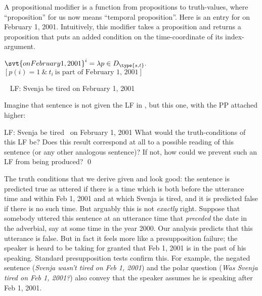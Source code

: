 A propositional modifier is a function from propositions to truth-values, where
``proposition'' for us now means ``temporal proposition''. Here is an entry for
on February 1, 2001. %
%
Intuitively, this modifier takes a proposition and returns a proposition that
puts an added condition on the time-coordinate of its index-argument.

\ex
$\svt{on February 1, 2001}^{i} = \lambda p \in D_{\type{s,t}}.$\\
\hfill$[p(i) = 1\ \&\ t_{i}\ \text{is part of February 1, 2001}]$\label{ex:pp}
\xe

\ex~ LF: \past \lb[VP] \lb[VP] Svenja be tired \rb \lb[PP] on February 1, 2001 \rb
\rb\label{ex:on-lf} \xe

\begin{exercise}
  Imagine that sentence  is not given the LF in \Last, but this one,
  with the PP attached higher:

  \ex LF: \lb[T$'$] \past \lb[VP] Svenja be tired \rb \rb\, \lb[PP] on
  February 1, 2001\rb \xe
%
  What would the truth-conditions of this LF be? Does this result correspond at
  all to a possible reading of this sentence (or any other analogous sentence)?
  If not, how could we prevent such an LF from being produced? \qed

\end{exercise}

The truth conditions that we derive given  and  look
good: the sentence is predicted true as uttered if there is a time which is both
before the utterance time and within Feb 1, 2001 and at which Svenja is tired, and
it is predicted false if there is no such time. But arguably this is not
\emph{exactly} right. Suppose that somebody uttered this sentence at an
utterance time that \emph{preceded} the date in the adverbial, say at some time
in the year 2000. Our analysis predicts that this utterance is false. But in
fact it feels more like a presupposition failure; the speaker is heard to be
taking for granted that Feb 1, 2001 is in the past of his speaking. Standard
presupposition tests confirm this. For example, the negated sentence (\emph{Svenja
  wasn't tired on Feb 1, 2001}) and the polar question (\emph{Was Svenja tired on
  Feb 1, 2001?}) also convey that the speaker assumes he is speaking after Feb
1, 2001.

